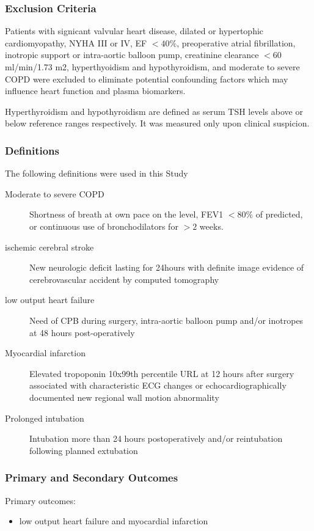 \documentclass[14pt,a4paper,onecolumn]{extarticle}
\begin{document}
\subsubsection{Exclusion Criteria}

Patients with signicant valvular heart disease, dilated or hypertophic cardiomyopathy, NYHA III or IV, EF $< 40\%$, preoperative atrial fibrillation, inotropic support or intra-aortic balloon pump, creatinine clearance $< 60$ ml/min/1.73 m2, hyperthyoidism and hypothyroidism, and moderate to severe COPD were excluded to eliminate potential confounding factors which may influence heart function and plasma biomarkers.

Hyperthyroidism and hypothyroidism are defined as serum TSH levels above or below reference ranges respectively.  It was measured only upon clinical suspicion.

\subsubsection{Definitions}
The following definitions were used in this Study
    \begin{description}
        \item [Moderate to severe COPD]
        Shortness of breath at own pace on the level, FEV1 $< 80\%$ of predicted, or continuous use of bronchodilators for $> 2$ weeks.
        \item [ischemic cerebral stroke]
        New neurologic deficit lasting for  24hours with definite image evidence of cerebrovascular accident by computed tomography
        \item [low output heart failure]
        Need of CPB during surgery, intra-aortic balloon pump and/or inotropes at 48 hours post-operatively
        \item [Myocardial infarction]
        Elevated tropoponin 10x99th percentile URL at 12 hours after surgery associated with characteristic ECG changes or echocardiographically documented new regional wall motion abnormality
        \item [Prolonged intubation]
        Intubation more than 24 hours postoperatively and/or reintubation following planned extubation
    \end{description}

\subsubsection{Primary and Secondary Outcomes}
Primary outcomes:
    \begin{itemize}
        \item low output heart failure and myocardial infarction
    \end{itemize}
\end{document}
